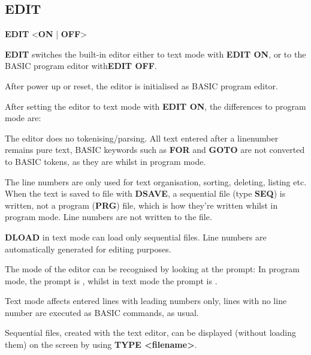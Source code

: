 
\newpage
\subsection{EDIT}
\begin{description}[leftmargin=2cm,style=nextline]
\item [Format:] {\bf EDIT} <{\bf ON} | {\bf OFF}>

\item [Usage:]  {\bf EDIT} switches the built-in editor
               either to text mode with {\bf EDIT ON},
               or to the BASIC program editor with{\bf EDIT OFF}.

               After power up or reset, the editor
               is initialised as BASIC program editor.

               After setting the editor to text mode with
               {\bf EDIT ON}, the differences to program mode are:

               The editor does no tokenising/parsing.
               All text entered after a linenumber remains pure text,
               BASIC keywords such as {\bf FOR} and {\bf GOTO} are not
               converted to BASIC tokens, as they are whilst in program mode.

               The line numbers are only used for text organisation,
               sorting, deleting, listing etc.
               When the text is saved to file with {\bf DSAVE},
               a sequential file (type {\bf SEQ}) is written, not a
               program ({\bf PRG}) file, which is how they're written whilst in program mode.
               Line numbers are not written to the file.

               {\bf DLOAD} in text mode can load only sequential files.
               Line numbers are automatically generated for editing purposes.

               The mode of the editor can be recognised by looking at the prompt:
               In program mode, the prompt is , whilst in text mode
               the prompt is .

               Text mode affects entered lines with leading numbers only,
               lines with no line number are executed as BASIC commands,
               as usual.

               Sequential files, created with the text editor, can be displayed
               (without loading them)
               on the screen by using {\bf TYPE <filename>}.


\end{description}
